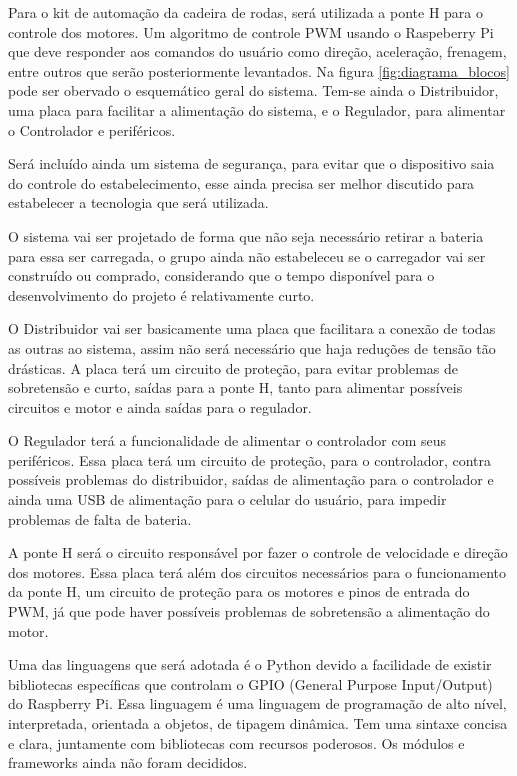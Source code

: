 Para o kit de automação da cadeira de rodas, será utilizada a ponte H para o controle dos motores. Um algoritmo de controle PWM usando o Raspeberry Pi que deve responder aos comandos do usuário como direção, aceleração, frenagem, entre outros que serão posteriormente levantados. Na figura \ref{fig:diagrama_blocos} pode ser obervado o esquemático geral do sistema. Tem-se ainda o Distribuidor, uma placa para facilitar a alimentação do sistema, e o Regulador, para alimentar o Controlador e periféricos.

Será incluído ainda um sistema de segurança, para evitar que o dispositivo saia do controle do estabelecimento, esse ainda precisa ser melhor discutido para estabelecer a tecnologia que será utilizada.

O sistema vai ser projetado de forma que não seja necessário retirar a bateria para essa ser carregada, o grupo ainda não estabeleceu se o carregador vai ser construído ou comprado, considerando que o tempo disponível para o desenvolvimento do projeto é relativamente curto.

O Distribuidor vai ser basicamente uma placa que facilitara a conexão de todas as outras ao sistema, assim não será necessário que haja reduções de tensão tão drásticas. A placa terá um circuito de proteção, para evitar problemas de sobretensão e curto, saídas para a ponte H, tanto para alimentar possíveis circuitos e motor e ainda saídas para o regulador.

O Regulador terá a funcionalidade de alimentar o controlador com seus periféricos. Essa placa terá um circuito de proteção, para o controlador, contra possíveis problemas do distribuidor, saídas de alimentação para o controlador e ainda uma USB de alimentação para o celular do usuário, para impedir problemas de falta de bateria.

A ponte H será o circuito responsável por fazer o controle de velocidade e direção dos motores. Essa placa terá além dos circuitos necessários para o funcionamento da ponte H, um circuito de proteção para os motores e pinos de entrada do PWM, já que pode haver possíveis problemas de sobretensão a alimentação do motor.

Uma das linguagens que será adotada é o Python devido a facilidade de existir bibliotecas específicas que controlam o GPIO  (General Purpose  Input/Output) do Raspberry Pi. Essa linguagem é uma linguagem de programação de alto nível, interpretada, orientada a objetos, de tipagem dinâmica. Tem uma sintaxe concisa e clara, juntamente com bibliotecas com recursos poderosos. Os módulos e frameworks ainda não foram decididos.








